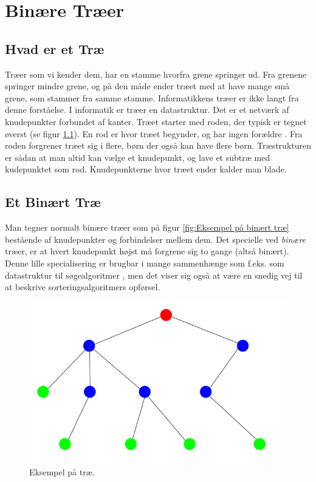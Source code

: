 \chapter{Binære Træer}
\label{ch:Binære Træer}


\section{Hvad er et Træ}
\label{sec:Hvad er et Træ}


Træer som vi kender dem, har en stamme hvorfra grene springer ud. Fra grenene springer mindre grene, og på den måde ender træet med at have mange små grene, som stammer fra samme stamme. Informatikkens træer er ikke langt fra denne forståelse. I informatik er træer en datastruktur. Det er et netværk af knudepunkter forbundet af kanter. Træet starter med roden, der typisk er tegnet øverst (se figur \ref{fig:Eksempel på træ.}). En rod er hvor træet begynder, og har ingen forældre \cite{trees}. Fra roden forgrener træet sig i flere, børn der også kan have flere børn. Træstrukturen er sådan at man altid kan vælge et knudepunkt, og lave et subtræ med kudepunktet som rod. Knudepunkterne hvor træet ender kalder man blade.

\section{Et Binært Træ}
\label{sec:Et Binært Træ}

Man tegner normalt binære træer som på figur \ref{fig:Eksempel på binært træ} bestående af knudepunkter og forbindelser mellem dem. Det specielle ved \emph{binære} træer, er at hvert knudepunkt højst må forgrene sig to gange (altså binært). Denne lille specialisering er brugbar i mange sammenhænge som f.eks. som datastruktur til søgealgoritmer \red{[kilde]}, men det viser sig også at være en snedig vej til at beskrive sorteringsalgoritmers opførsel.

\begin{figure}
	\begin{center}
		\includegraphics[scale=0.35]{../img/tree.png}
	\end{center}
	\caption{Eksempel på træ.}
	\label{fig:Eksempel på træ.}
\end{figure}



